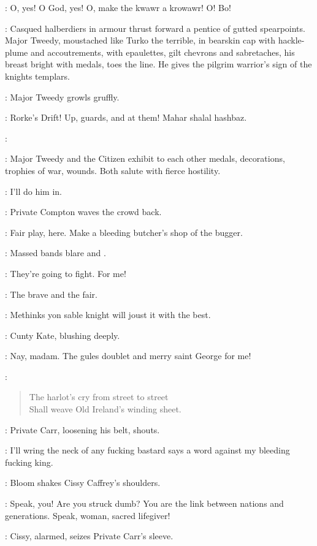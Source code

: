 \Navvy:
O, yes!
O God, yes!
O, make the kwawr a krowawr!
O! Bo!%

:
Casqued halberdiers in armour thrust forward a pentice of gutted spearpoints.
Major Tweedy, moustached like Turko the terrible,
in bearskin cap with hackle-plume and accoutrements,
with epaulettes, gilt chevrons and sabretaches,
his breast bright with medals, toes the line.
He gives the pilgrim warrior's sign of the knights templars.

:
Major Tweedy growls gruffly.

\MajorTweedy:
Rorke's Drift!
Up, guards, and at them!
Mahar shalal hashbaz.

\Citizen[2]:

:
Major Tweedy and the Citizen exhibit to each other medals,
decorations, trophies of war, wounds.
Both salute with fierce hostility.

\Carr[2]:
I'll do him in.

:
Private Compton waves the crowd back.

\Compton:
Fair play, here.
Make a bleeding butcher's shop of the bugger.

:
Massed bands blare  and .%

\Cissy[2]:
They're going to fight.
For me!

\CuntyKate[2]:
The brave and the fair.

\BiddyClap[2]:
Methinks yon sable knight will joust it with the best.

:
Cunty Kate, blushing deeply.

\CuntyKate:
Nay, madam.
The gules doublet and merry saint George for me!

\Stephen:
\begin{verse}
    The harlot's cry from street to street\\
    Shall weave Old Ireland's winding sheet.
\end{verse}

:
Private Carr, loosening his belt, shouts.

\Carr:
I'll wring the neck of any fucking bastard
says a word against my bleeding fucking king.

:
Bloom shakes Cissy Caffrey's shoulders.

\Bloom:
Speak, you!
Are you struck dumb?
You are the link between nations and generations.
Speak, woman, sacred lifegiver!

:
Cissy, alarmed, seizes Private Carr's sleeve.

